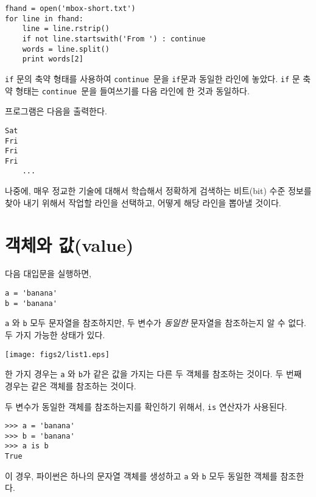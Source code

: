 \beforeverb
\begin{verbatim}
fhand = open('mbox-short.txt')
for line in fhand:
    line = line.rstrip()
    if not line.startswith('From ') : continue
    words = line.split()
    print words[2]
\end{verbatim}
\afterverb
%

{\tt if} 문의 축약 형태를 사용하여 {\tt continue }문을 {\tt if}문과 동일한 라인에 놓았다.
{\tt if} 문 축약 형태는 {\tt continue }문을 들여쓰기를 다음 라인에 한 것과 동일하다.

프로그램은 다음을 출력한다.

\beforeverb
\begin{verbatim}
Sat
Fri
Fri
Fri
    ...
\end{verbatim}
\afterverb
%

나중에, 매우 정교한 기술에 대해서 학습해서 정확하게 검색하는 비트(bit) 수준 정보를 찾아 내기 위해서 작업할 라인을 선택하고, 어떻게 해당 라인을 뽑아낼 것이다. 

\section{객체와 값(value)}


다음 대입문을 실행하면,

\beforeverb
\begin{verbatim}
a = 'banana'
b = 'banana'
\end{verbatim}
\afterverb
%

{\tt a} 와 {\tt b} 모두 문자열을 참조하지만, 두 변수가 \emph{동일한} 문자열을 참조하는지 알 수 없다.
두 가지 가능한 상태가 있다.


\beforefig
\centerline{\texttt{[image: figs2/list1.eps]}}
\afterfig

한 가지 경우는 {\tt a} 와 {\tt b}가 같은 값을 가지는 다른 두 객체를 참조하는 것이다. 
두 번째 경우는 같은 객체를 참조하는 것이다.


두 변수가 동일한 객체를 참조하는지를 확인하기 위해서, {\tt is} 연산자가 사용된다.

\beforeverb
\begin{verbatim}
>>> a = 'banana'
>>> b = 'banana'
>>> a is b
True
\end{verbatim}
\afterverb
%

이 경우, 파이썬은 하나의 문자열 객체를 생성하고 {\tt a} 와 {\tt b} 모두 동일한 객체를 참조한다.

